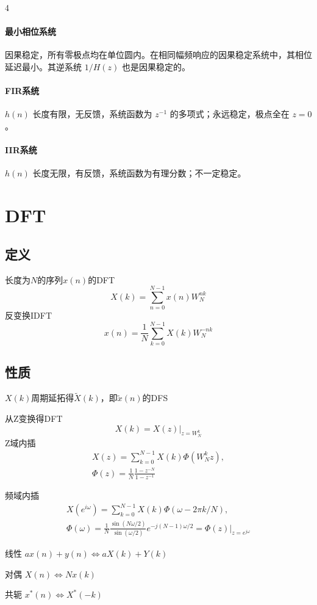 \documentclass[8pt, a4paper]{extarticle}
\begin{document}
\begin{multicols}{4}
\paragraph{最小相位系统} 因果稳定，所有零极点均在单位圆内。在相同幅频响应的因果稳定系统中，其相位延迟最小。其逆系统 \(1/H(z)\) 也是因果稳定的。
\paragraph{FIR系统} \(h(n)\) 长度有限，无反馈，系统函数为 \(z^{-1}\) 的多项式；永远稳定，极点全在 \(z=0\)。
\paragraph{IIR系统} \(h(n)\) 长度无限，有反馈，系统函数为有理分数；不一定稳定。

\section{DFT}
\subsection{定义}
长度为\(N\)的序列\(x(n)\)的DFT
\[
X(k)=\sum_{n=0}^{N-1}x(n)W_N^{nk}
\]
反变换IDFT
\[
x(n)=\frac{1}{N}\sum_{k=0}^{N-1}X(k)W_N^{-nk}
\]

\subsection{性质}
\(X(k)\)周期延拓得\(\tilde{X}(k)\)，即\(\tilde{x}(n)\)的DFS

从Z变换得DFT
\[
X(k)=X(z)\bigr|_{z=W_N^k}
\]
Z域内插
\begin{gather*}
X(z)=\sum_{k=0}^{N-1}X(k)\Phi(W_N^k z),\\
\Phi(z) = \frac{1}{N}\frac{1-z^{-N}}{1-z^{-1}}
\end{gather*}

频域内插
\begin{gather*}
X(e^{i\omega})=\sum_{k=0}^{N-1}X(k)\Phi(\omega-2\pi k/N),\\
\Phi(\omega) = \frac{1}{N}\frac{\sin(N\omega/2)}{\sin(\omega/2)}e^{-j(N-1)\omega/2} = \Phi(z)\bigr|_{z=e^{j\omega}}
\end{gather*}

线性
\(
ax(n)+y(n)\Leftrightarrow aX(k)+Y(k)
\)

对偶
\(
X(n)\Leftrightarrow Nx(k)
\)

共轭
\(
x^*(n)\Leftrightarrow X^*(-k)
\)


\end{multicols}
\end{document}

